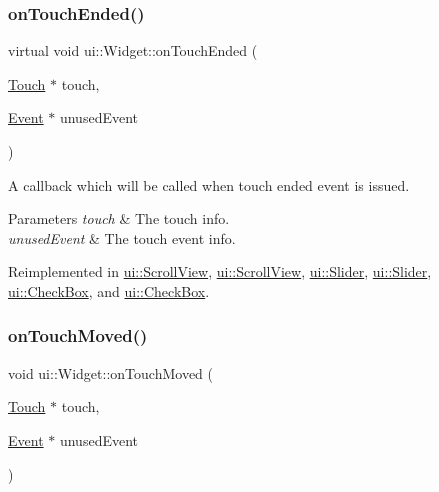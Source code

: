 \mbox{\label{classui_1_1Widget_a72e5e4992dc42c5209759d3c1ee95387}} 
\subsubsection{\texorpdfstring{on\+Touch\+Ended()}{onTouchEnded()}\hspace{0.1cm}{\footnotesize\ttfamily [2/2]}}
{\footnotesize\ttfamily virtual void ui\+::\+Widget\+::on\+Touch\+Ended (\begin{DoxyParamCaption}\item[{\hyperlink{classTouch}{Touch} $\ast$}]{touch,  }\item[{\hyperlink{classEvent}{Event} $\ast$}]{unused\+Event }\end{DoxyParamCaption})\hspace{0.3cm}{\ttfamily [virtual]}}

A callback which will be called when touch ended event is issued. 
\begin{DoxyParams}{Parameters}
{\em touch} & The touch info. \\
\hline
{\em unused\+Event} & The touch event info. \\
\hline
\end{DoxyParams}


Reimplemented in \hyperlink{classui_1_1ScrollView_a3bb1022184ffae6a9fc2e4f0668cddab}{ui\+::\+Scroll\+View}, \hyperlink{classui_1_1ScrollView_a74f857678194c7be230c7f66306ad5c6}{ui\+::\+Scroll\+View}, \hyperlink{classui_1_1Slider_a4729193d3c8dd8d1426f97a4ec13869e}{ui\+::\+Slider}, \hyperlink{classui_1_1Slider_afeaab747b9a9b3a71ebc77ff21e86008}{ui\+::\+Slider}, \hyperlink{classui_1_1CheckBox_a52c24b8aef0e2ea66f5220f49a95f510}{ui\+::\+Check\+Box}, and \hyperlink{classui_1_1CheckBox_a95506c0d1b1bcab1b258ed62d4cc718a}{ui\+::\+Check\+Box}.

\mbox{\label{classui_1_1Widget_a16e6247b1c43273eac77623e8f129dd4}} 
\subsubsection{\texorpdfstring{on\+Touch\+Moved()}{onTouchMoved()}\hspace{0.1cm}{\footnotesize\ttfamily [1/2]}}
{\footnotesize\ttfamily void ui\+::\+Widget\+::on\+Touch\+Moved (\begin{DoxyParamCaption}\item[{\hyperlink{classTouch}{Touch} $\ast$}]{touch,  }\item[{\hyperlink{classEvent}{Event} $\ast$}]{unused\+Event }\end{DoxyParamCaption})\hspace{0.3cm}{\ttfamily [virtual]}}

